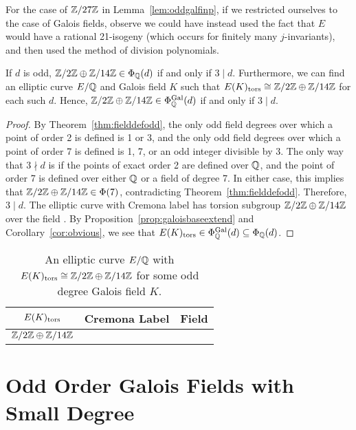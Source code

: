 For the case of $\mathbb{Z}/27\mathbb{Z}$ in Lemma~\ref{lem:oddgalfinp}, if we restricted ourselves to the case of Galois fields, observe we could have instead used the fact that $E$ would have a rational 21-isogeny (which occurs for finitely many $j$-invariants), and then used the method of division polynomials. 


\begin{lem} \label{lem:oddgal214}
If $d$ is odd, $\mathbb{Z}/2\mathbb{Z} \oplus \mathbb{Z}/14\mathbb{Z} \in \Phi_{\mathbb{Q}}(d)$ if and only if $3 \mid d$. Furthermore, we can find an elliptic curve $E/\mathbb{Q}$ and Galois field $K$ such that $E(K)_{\text{tors}} \cong \mathbb{Z}/2\mathbb{Z} \oplus \mathbb{Z}/14\mathbb{Z}$ for each such $d$. Hence, $\mathbb{Z}/2\mathbb{Z} \oplus \mathbb{Z}/14\mathbb{Z} \in \Phi_{\mathbb{Q}}^{\operatorname{Gal}}(d)$ if and only if $3 \mid d$.
\end{lem}

\begin{proof}
By Theorem~\ref{thm:fielddefodd}, the only odd field degrees over which a point of order 2 is defined is 1 or 3, and the only odd field degrees over which a point of order 7 is defined is 1, 7, or an odd integer divisible by 3. The only way that $3 \nmid d$ is if the points of exact order 2 are defined over $\mathbb{Q}$, and the point of order 7 is defined over either $\mathbb{Q}$ or a field of degree 7. In either case, this implies that $\mathbb{Z}/2\mathbb{Z} \oplus \mathbb{Z}/14\mathbb{Z} \in \Phi(7)$, contradicting Theorem~\ref{thm:fielddefodd}. Therefore, $3 \mid d$. The elliptic curve with Cremona label \onttet{} has torsion subgroup $\mathbb{Z}/2\mathbb{Z} \oplus \mathbb{Z}/14\mathbb{Z}$ over the field \ttnsoo{}. By Proposition~\ref{prop:galoisbaseextend} and Corollary~\ref{cor:obvious}, we see that $E(K)_{\text{tors}} \in \Phi_{\mathbb{Q}}^{\operatorname{Gal}}(d) \subseteq \Phi_{\mathbb{Q}}(d)$. 
\end{proof}


	\begin{table}[!ht]
	\centering
	\caption{An elliptic curve $E/\mathbb{Q}$ with $E(K)_{\text{tors}} \cong \mathbb{Z}/2\mathbb{Z} \oplus \mathbb{Z}/14\mathbb{Z}$ for some odd degree Galois field $K$.\label{tab:2-14ex}}
	\begin{tabular}{ccc} \hline
	$E(K)_{\text{tors}}$ & Cremona Label & Field \\ \hline
	$\mathbb{Z}/2\mathbb{Z} \oplus \mathbb{Z}/14\mathbb{Z}$ & \onttet{} & \ttnsoo{}
	\end{tabular}
	\end{table}



\section{Odd Order Galois Fields with Small Degree}


